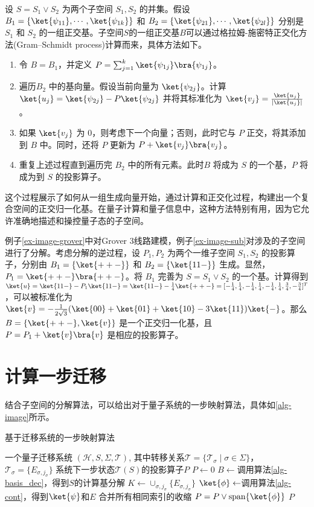设 $S=S_1\vee S_2$ 为两个子空间 $S_1,S_2$ 的并集。假设 $B_1=\{\ket{\psi_{11}},\cdots,\ket{\psi_{1k}}\}$ 和 $B_2=\{\ket{\psi_{21}},\cdots,\ket{\psi_{2l}}\}$ 分别是 $S_1$ 和 $S_2$ 的一组正交基。子空间$S$的一组正交基$B$可以通过格拉姆-施密特正交化方法(Gram–Schmidt process)计算而来，具体方法如下。
\begin{enumerate}
    \item 令 $B=B_1$，并定义 $P=\sum_{j=1}^{k}{\ket{\psi_{1j}}\bra{\psi_{1j}}}$。
    \item 遍历$B_2$ 中的基向量。假设当前向量为 $\ket{\psi_{2j}}$。计算 $\ket{u_j}=\ket{\psi_{2j}}-P\ket{\psi_{2j}}$ 并将其标准化为 $\ket{v_j}=\frac{\ket{u_j}}{|\ket{u_j}|}$。
    \item 如果 $\ket{v_j}$ 为 0，则考虑下一个向量；否则，此时它与 $P$ 正交，将其添加到 $B$ 中。同时，还将 $P$ 更新为 $P+\ket{v_j}\bra{v_j}$。
    \item 重复上述过程直到遍历完 $B_2$ 中的所有元素。此时$B$ 将成为 $S$ 的一个基，$P$ 将成为到 $S$ 的投影算子。
\end{enumerate}

这个过程展示了如何从一组生成向量开始，通过计算和正交化过程，构建出一个复合空间的正交归一化基。在量子计算和量子信息中，这种方法特别有用，因为它允许准确地描述和操控量子态的子空间。

\begin{example}
    例子\ref{ex-image-grover}中对Grover 3线路建模，例子\ref{ex-image-sub}对涉及的子空间进行了分解。考虑分解的逆过程，设 $P_1,P_2$ 为两个一维子空间 $S_1,S_2$ 的投影算子，分别由 $B_1=\{\ket{++-}\}$ 和 $B_2=\{\ket{11-}\}$ 生成。显然，$P_1=\ket{++-}\bra{++-}$。将 $B_1$ 完善为 $S=S_1\vee S_2$ 的一个基。计算得到$\ket{u}=\ket{11-}-P_1\ket{11-}=\ket{11-}-\frac{1}{4}\ket{++-}=[-\frac{1}{4},\frac{1}{4},-\frac{1}{4},\frac{1}{4},-\frac{1}{4},\frac{1}{4},\frac{3}{4},-\frac{3}{4}]^T$，可以被标准化为 $\ket{v}=-\frac{1}{2\sqrt{3}}(\ket{00}+\ket{01}+\ket{10}-3\ket{11})\ket{-}$。那么 $B=\{\ket{++-},\ket{v}\}$ 是一个正交归一化基，且 $P=P_1+\ket{v}\bra{v}$ 是相应的投影算子。
\end{example}
\section{计算一步迁移}
结合子空间的分解算法，可以给出对于量子系统的一步映射算法，具体如\ref{alg-image}所示。
\begin{algorithm}
\caption{基于迁移系统的一步映射算法}
\label{alg-image}
\begin{algorithmic}[1] %
\Require 一个量子迁移系统 $(\mathcal{H},S,\Sigma,\mathcal{T})$, 其中转移关系$\mathcal{T}=\{\mathcal{T}_\sigma\mid \sigma\in \Sigma\}$，  $\mathcal{T}_\sigma=\{E_{\sigma,j_\sigma}\}$
\Ensure 系统下一步状态$\mathcal{T}(S)$的投影算子$P$
\State $P \gets 0$ 
\State $B \gets $调用算法\ref{alg-basis_dec}，得到$S$的计算基分解
\State $K \gets \cup_{\sigma,j_\sigma}\{E_{\sigma,j_\sigma}\}$
    \State $\ket{\phi} \gets $调用算法\ref{alg-cont}，得到\(\ket{\psi}\)和\(E\) 合并所有相同索引的收缩
    \State $P=P \vee \text{span}\{\ket{\phi}\}$
\EndFor
\State \Return $P$ 
\end{algorithmic}
\end{algorithm}

